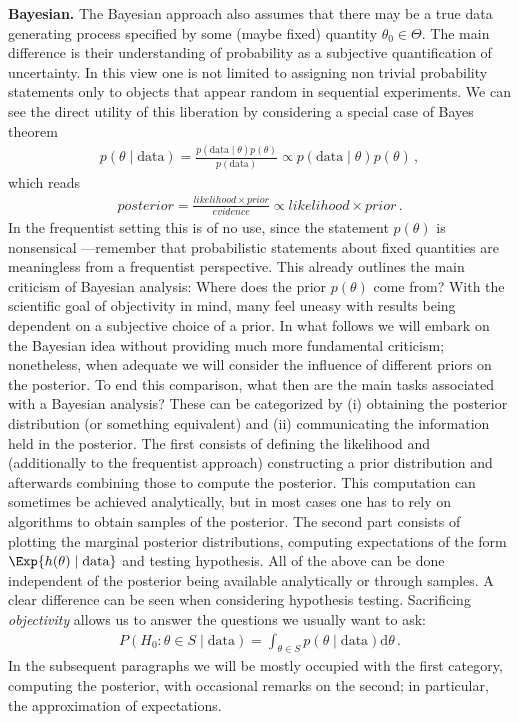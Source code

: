\textbf{Bayesian.} The Bayesian approach also assumes that there may be a true data generating process specified by some (maybe fixed) quantity $\theta_0 \in \Theta$.
The main difference is their understanding of probability as a subjective quantification of uncertainty.
In this view one is not limited to assigning non trivial probability statements only to objects that appear random in sequential experiments.
We can see the direct utility of this liberation by considering a special case of Bayes theorem
\begin{align}
  p(\theta \mid \text{data}) = \frac{p(\text{data} \mid \theta) p(\theta)}{p(\text{data})} \propto p(\text{data} \mid \theta) p(\theta) \,,
\end{align}
which reads
\begin{align}
  posterior = \frac{likelihood \times prior}{evidence} \propto likelihood \times prior \,.
\end{align}
In the frequentist setting this is of no use, since the statement $p(\theta)$ is nonsensical ---remember that probabilistic statements about fixed quantities are meaningless from a frequentist perspective.
This already outlines the main criticism of Bayesian analysis: Where does the prior $p(\theta)$ come from?
With the scientific goal of objectivity in mind, many feel uneasy with results being dependent on a subjective choice of a prior.
In what follows we will embark on the Bayesian idea without providing much more fundamental criticism; nonetheless, when adequate we will consider the influence of different priors on the posterior.
To end this comparison, what then are the main tasks associated with a Bayesian analysis?
These can be categorized by (i) obtaining the posterior distribution (or something equivalent) and (ii) communicating the information held in the posterior.
The first consists of defining the likelihood and (additionally to the frequentist approach) constructing a prior distribution and afterwards combining those to compute the posterior.
This computation can sometimes be achieved analytically, but in most cases one has to rely on algorithms to obtain samples of the posterior.
The second part consists of plotting the marginal posterior distributions, computing expectations of the form $\Exp{h(\theta) \mid \text{data}}$ and testing hypothesis.
All of the above can be done independent of the posterior being available analytically or through samples.
A clear difference can be seen when considering hypothesis testing.
Sacrificing \textit{objectivity} allows us to answer the questions we usually want to ask:
\begin{align}
  P(H_0: \theta \in S \mid \text{data}) = \int_{\theta \in S} p(\theta \mid \text{data}) \mathrm{d}\theta \,.
\end{align}
In the subsequent paragraphs we will be mostly occupied with the first category, computing the posterior, with occasional remarks on the second; in particular, the approximation of expectations.

